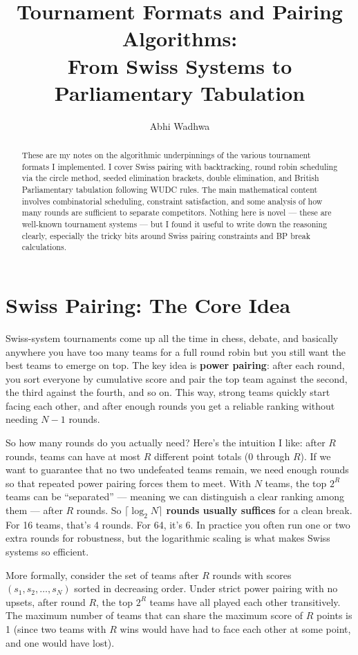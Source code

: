 \documentclass[11pt]{article}
\title{Tournament Formats and Pairing Algorithms:\\From Swiss Systems to Parliamentary Tabulation}
\author{Abhi Wadhwa}
\date{}
\begin{document}
\maketitle

\begin{abstract}
These are my notes on the algorithmic underpinnings of the various tournament formats I implemented. I cover Swiss pairing with backtracking, round robin scheduling via the circle method, seeded elimination brackets, double elimination, and British Parliamentary tabulation following WUDC rules. The main mathematical content involves combinatorial scheduling, constraint satisfaction, and some analysis of how many rounds are sufficient to separate competitors. Nothing here is novel --- these are well-known tournament systems --- but I found it useful to write down the reasoning clearly, especially the tricky bits around Swiss pairing constraints and BP break calculations.
\end{abstract}

\section{Swiss Pairing: The Core Idea}

Swiss-system tournaments come up all the time in chess, debate, and basically anywhere you have too many teams for a full round robin but you still want the best teams to emerge on top. The key idea is \textbf{power pairing}: after each round, you sort everyone by cumulative score and pair the top team against the second, the third against the fourth, and so on. This way, strong teams quickly start facing each other, and after enough rounds you get a reliable ranking without needing $N - 1$ rounds.

So how many rounds do you actually need? Here's the intuition I like: after $R$ rounds, teams can have at most $R$ different point totals (0 through $R$). If we want to guarantee that no two undefeated teams remain, we need enough rounds so that repeated power pairing forces them to meet. With $N$ teams, the top $2^R$ teams can be ``separated'' --- meaning we can distinguish a clear ranking among them --- after $R$ rounds. So \textbf{$\lceil \log_2 N \rceil$ rounds usually suffices} for a clean break. For 16 teams, that's 4 rounds. For 64, it's 6. In practice you often run one or two extra rounds for robustness, but the logarithmic scaling is what makes Swiss systems so efficient.

More formally, consider the set of teams after $R$ rounds with scores $(s_1, s_2, \ldots, s_N)$ sorted in decreasing order. Under strict power pairing with no upsets, after round $R$, the top $2^R$ teams have all played each other transitively. The maximum number of teams that can share the maximum score of $R$ points is 1 (since two teams with $R$ wins would have had to face each other at some point, and one would have lost).
\end{document}
